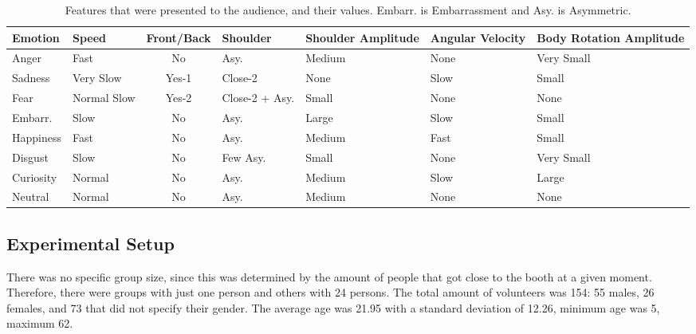 \begin{table}[tbh]
\begin{center}
\small
\caption{Features that were presented to the audience, and their values. Embarr. is Embarrassment and Asy. is Asymmetric.}
\label{table:features}
\begin{tabular}{|p{1.5 cm}|p{1.5 cm}|c|p{1.5 cm}|p{1.6 cm}|p{1.6 cm}|m{1.5 cm}|}
\hline 
\textbf{Emotion} & \textbf{Speed} & \textbf{Front/Back} & \textbf{Shoulder} & \textbf{Shoulder Amplitude} & \textbf{Angular Velocity} & \textbf{Body Rotation Amplitude} \\ 
\hline
Anger & Fast & No & Asy. & Medium & None & Very Small \\
\hline
Sadness & Very Slow & Yes-1 & Close-2 & None & Slow & Small \\
\hline
Fear & Normal Slow & Yes-2 & Close-2 + Asy. & Small & None & None \\ 
\hline
Embarr. & Slow & No & Asy. & Large & Slow & Small \\
\hline
Happiness & Fast & No & Asy. & Medium & Fast & Small \\
\hline
Disgust & Slow & No & Few Asy. & Small & None & Very Small \\
\hline
Curiosity & Normal & No & Asy. & Medium & Slow & Large \\
\hline
Neutral & Normal & No & Asy. & Medium & None & None \\
\hline
\end{tabular}
\end{center}
\vspace{-0.5cm}
\end{table} 
\subsection{Experimental Setup}
There was no specific group size, since this was determined by the amount of people that got close to the booth at a given moment. Therefore, there were groups with just one person and others with 24 persons. The total amount of volunteers was 154: 55 males, 26 females, and 73 that did not specify their gender. The average age was 21.95 with a standard deviation of 12.26, minimum age was 5, maximum 62.
